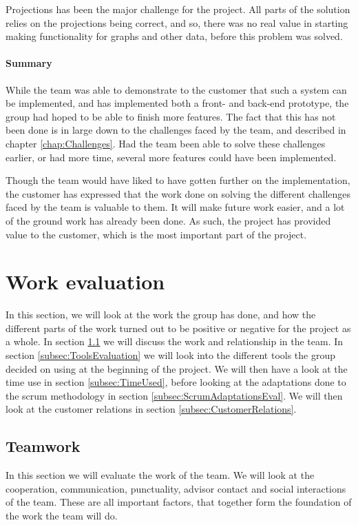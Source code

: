 \documentclass[11pt,a4paper,titlepage,oneside]{report}
\begin{document}
Projections has been the major challenge for the project. All parts of the solution relies on the projections being correct, and so, there was no real value in starting making functionality for graphs and other data, before this problem was solved. 

\paragraph{Summary} While the team was able to demonstrate to the customer that such a system can be implemented, and has implemented both a front- and back-end \gls{prototype}, the group had hoped to be able to finish more features. The fact that this has not been done is in large down to the challenges faced by the team, and described in chapter \ref{chap:Challenges}. Had the team been able to solve these challenges earlier, or had more time, several more features could have been implemented.

Though the team would have liked to have gotten further on the implementation, the customer has expressed that the work done on solving the different challenges faced by the team is valuable to them. It will make future work easier, and a lot of the ground work has already been done. As such, the project has provided value to the customer, which is the most important part of the project.

\newpage
\section{Work evaluation}
In this section, we will look at the work the group has done, and how the different parts of the work turned out to be positive or negative for the project as a whole. In section \ref{subsec:Teamwork} we will discuss the work and relationship in the team. In section \ref{subsec:ToolsEvaluation} we will look into the different tools the group decided on using at the beginning of the project. We will then have a look at the time use in section \ref{subsec:TimeUsed}, before looking at the adaptations done to the scrum methodology in section \ref{subsec:ScrumAdaptationsEval}. We will then look at the customer relations in section \ref{subsec:CustomerRelations}.

\subsection{Teamwork}
\label{subsec:Teamwork}
In this section we will evaluate the work of the team. We will look at the cooperation, communication, punctuality, advisor contact and social interactions of the team. These are all important factors, that together form the foundation of the work the team will do.
\end{document}
